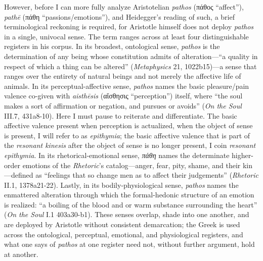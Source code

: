 \documentclass{article}
\newcommand{\gk}[1]{{\greekfont #1}}
\begin{document}
However, before I can more fully analyze Aristotelian \textit{pathos} (\gk{πάθος} ``affect''), \textit{pathē} (\gk{πάθη}  ``passions/emotions''), and Heidegger's reading of such, a brief terminological reckoning is required, for Aristotle himself does not deploy \textit{pathos} in a single, univocal sense. The term ranges across at least four distinguishable registers in his corpus. In its broadest, ontological sense, \textit{pathos} is the determination of any being whose constitution admits of alteration---``a quality in respect of which a thing can be altered'' (\textit{Metaphysics} 21, 1022b15)---a sense that ranges over the entirety of natural beings and not merely the affective life of animals. In its perceptual-affective sense, \textit{pathos} names the basic pleasure/pain valence co-given with \textit{aisthēsis} (\gk{αἴσθησις} ``perception'') itself, where ``the soul makes a sort of affirmation or negation, and pursues or avoids'' (\textit{On the Soul} III.7, 431a8-10). Here I must pause to reiterate and differentiate. The basic affective valence present when perception is actualized, when the object of sense is present, I will refer to as \textit{epithymia}; the basic affective valence that is part of the \textit{resonant kinesis} after the object of sense is no longer present, I coin \textit{resonant epithymia}. In its rhetorical-emotional sense, \textit{πάθη} names the determinate higher-order emotions of the \textit{Rhetoric}'s catalog---anger, fear, pity, shame, and their kin---defined as ``feelings that so change men as to affect their judgements'' (\textit{Rhetoric} II.1, 1378a21-22). Lastly, in its bodily-physiological sense, \textit{pathos} names the enmattered alteration through which the formal-hedonic structure of an emotion is realized: ``a boiling of the blood and or warm substance surrounding the heart'' (\textit{On the Soul} I.1 403a30-b1). These senses overlap, shade into one another, and are deployed by Aristotle without consistent demarcation; the Greek is used across the ontological, perceptual, emotional, and physiological registers, and what one says of \textit{pathos} at one register need not, without further argument, hold at another. 
\end{document}
